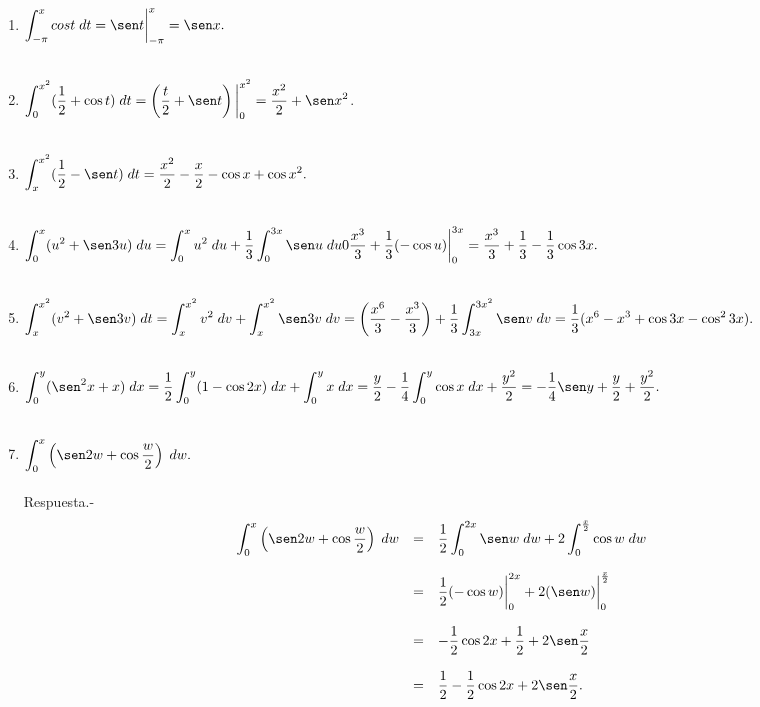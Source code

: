 \begin{enumerate}[\bfseries  1.]
    \item $\displaystyle\int_{-\pi}^{x} cos t\; dt = \sen t \bigg|_{-\pi}^x = \sen x.$\\\\

    \item $\displaystyle\int_0^{x^2} (\frac{1}{2}+\cos t)\; dt = \left(\dfrac{t}{2}+\sen t\right)\bigg|_0^{x^2} = \dfrac{x^2}{2}+\sen x^2$.\\\\

    \item $\displaystyle\int_x^{x^2}(\frac{1}{2}-\sen t)\; dt = \dfrac{x^2}{2}-\dfrac{x}{2}-\cos x + \cos x^2.$\\\\
   
    \item $\displaystyle\int_0^x (u^2 + \sen 3u)\; du = \int_0^x u^2\; du + \dfrac{1}{3}\int_0^{3x}\sen u\; du 0 \dfrac{x^3}{3}+\dfrac{1}{3}(-\cos u)\bigg|_0^{3x} = \dfrac{x^3}{3}+\dfrac{1}{3}-\dfrac{1}{3}\cos 3x.$\\\\

    \item $\displaystyle\int_x^{x^2}(v^2 + \sen 3v)\; dt = \int_x^{x^2}v^2\; dv + \int_x^{x^2}\sen 3v\; dv = \left(\dfrac{x^6}{3}-\dfrac{x^3}{3}\right)+\dfrac{1}{3}\int_{3x}^{3x^2}\sen v\; dv = \dfrac{1}{3}(x^6-x^3+\cos3x - \cos^2 3x).$\\\\

    \item $\displaystyle\int_0^y (\sen^2x+x)\; dx = \dfrac{1}{2}\int_0^y (1-\cos2x)\; dx + \int_0^y x\; dx = \dfrac{y}{2}-\dfrac{1}{4}\int_0^y \cos x \; dx + \dfrac{y^2}{2} = -\dfrac{1}{4}\sen y + \dfrac{y}{2} + \dfrac{y^2}{2}.$\\\\

    \item $\displaystyle\int_0^x \left(\sen 2w + \cos \dfrac{w}{2}\right)\; dw.$\\\\
	Respuesta.-\;
	$$\begin{array}{rcl}
	    \displaystyle\int_0^x \left(\sen 2w + \cos \dfrac{w}{2}\right)\; dw&=&\displaystyle\dfrac{1}{2}\int_0^{2x}\sen w\; dw + 2\int_0^{\frac{x}{2}}\cos w\; dw\\\\
									       &=&\dfrac{1}{2}(-\cos w)\bigg|_0^{2x} + 2(\sen w)\bigg|_0^{\frac{x}{2}}\\\\
									       &=&-\dfrac{1}{2}\cos 2x +\dfrac{1}{2}+2\sen \dfrac{x}{2}\\\\
									       &=&\dfrac{1}{2}-\dfrac{1}{2}\cos 2x +2\sen \dfrac{x}{2}.\\\\
	\end{array}$$


\end{enumerate}
